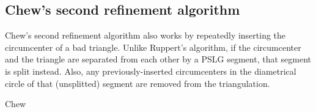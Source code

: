 \subsection{Chew's second refinement algorithm}
\label{sub:chews}

Chew's second refinement algorithm also works by repeatedly inserting the circumcenter of a bad triangle.
Unlike Ruppert's algorithm, if the circumcenter and the triangle are separated from each other by a PSLG segment, that segment is split instead.
Also, any previously-inserted circumcenters in the diametrical circle of that (unsplitted) segment are removed from the triangulation.
\cite{shewchuk}

\begin{algorithm}
    \caption{Chew}
    \begin{algorithmic}
                \Else
                \EndIf
            \EndWhile
        \EndFunction
    \end{algorithmic}
\end{algorithm}

